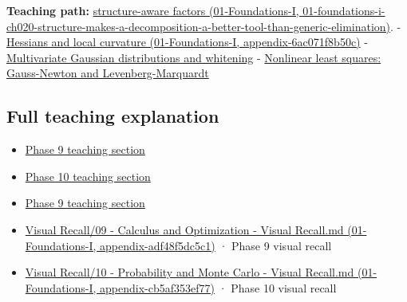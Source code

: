 \textbf{Teaching path:} \href{../01-Foundations-I/main.pdf\#nameddest=01-foundations-i-ch020-structure-makes-a-decomposition-a-better-tool-than-generic-elimination}{structure-aware factors (01-Foundations-I, 01-foundations-i-ch020-structure-makes-a-decomposition-a-better-tool-than-generic-elimination)}. - \href{../01-Foundations-I/main.pdf\#nameddest=appendix-6ac071f8b50c}{Hessians and local curvature (01-Foundations-I, appendix-6ac071f8b50c)} - \hyperref[appendix-12bbe185dbe5]{Multivariate Gaussian distributions and whitening} - \hyperref[appendix-2c2df8345991]{Nonlinear least squares: Gauss-Newton and Levenberg-Marquardt}

\subsection{Full teaching explanation}\label{appendix-50d2ea3c9b26-full-teaching-explanation}

\begin{itemize}
\tightlist
\item
  \hyperref[02-foundations-ii-ch021-jacobians-curvature-and-local-approximation]{Phase 9 teaching section}
\item
  \hyperref[02-foundations-ii-ch024-waiting-times-event-counts-and-covariance-geometry]{Phase 10 teaching section}
\item
  \hyperref[02-foundations-ii-ch026-optimization-and-inverse-problems]{Phase 9 teaching section}
\item
  \href{../01-Foundations-I/main.pdf\#nameddest=appendix-adf48f5dc5c1}{Visual Recall/09 - Calculus and Optimization - Visual Recall.md (01-Foundations-I, appendix-adf48f5dc5c1)} · Phase 9 visual recall
\item
  \href{../01-Foundations-I/main.pdf\#nameddest=appendix-cb5af353ef77}{Visual Recall/10 - Probability and Monte Carlo - Visual Recall.md (01-Foundations-I, appendix-cb5af353ef77)} · Phase 10 visual recall
\end{itemize}
